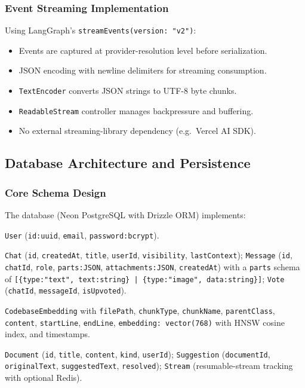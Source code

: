 \documentclass[11pt,a4paper]{report}
\newcommand{\code}[1]{\texttt{\small #1}}
\begin{document}
\subsubsection{Event Streaming Implementation}

Using LangGraph's \code{streamEvents(version: "v2")}:

\begin{itemize}
  \item Events are captured at provider-resolution level before serialization.
  \item JSON encoding with newline delimiters for streaming consumption.
  \item \code{TextEncoder} converts JSON strings to UTF-8 byte chunks.
  \item \code{ReadableStream} controller manages backpressure and buffering.
  \item No external streaming-library dependency (e.g.\ Vercel AI SDK).
\end{itemize}

\subsection{Database Architecture and Persistence}

\subsubsection{Core Schema Design}

The database (Neon PostgreSQL with Drizzle ORM) implements:

\begin{description}[leftmargin=1.6em,style=nextline]
  \item[User Management.] \code{User} (\code{id:uuid}, \code{email}, \code{password:bcrypt}).
  \item[Chat \& Messages.] \code{Chat} (\code{id}, \code{createdAt}, \code{title}, \code{userId}, \code{visibility}, \code{lastContext}); \code{Message} (\code{id}, \code{chatId}, \code{role}, \code{parts:JSON}, \code{attachments:JSON}, \code{createdAt}) with a \code{parts} schema of \code{[\{type:"text", text:string\} | \{type:"image", data:string\}]}; \code{Vote} (\code{chatId}, \code{messageId}, \code{isUpvoted}).
  \item[RAG for CodebaseAgent.] \code{CodebaseEmbedding} with \code{filePath}, \code{chunkType}, \code{chunkName}, \code{parentClass}, \code{content}, \code{startLine}, \code{endLine}, \code{embedding: vector(768)} with HNSW cosine index, and timestamps.
  \item[Artifacts \& Examples.] \code{Document} (\code{id}, \code{title}, \code{content}, \code{kind}, \code{userId}); \code{Suggestion} (\code{documentId}, \code{originalText}, \code{suggestedText}, \code{resolved}); \code{Stream} (resumable-stream tracking with optional Redis).
\end{description}
\end{document}
